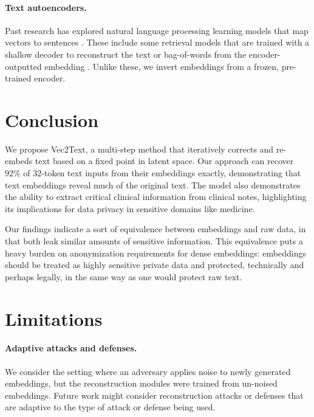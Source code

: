 \documentclass[11pt]{article}
\newcommand{\MethodName}{Vec2Text}
\begin{document}
\paragraph{Text autoencoders.} Past research has explored natural language processing learning models that map vectors to sentences \cite{bowman2016generating}. These include some retrieval models that are trained with a shallow decoder to reconstruct the text or bag-of-words from the encoder-outputted embedding \cite{xiao2022retromae,shen2023lexmae,wang2023simlm}. Unlike these, we invert embeddings from a frozen, pre-trained encoder.

\section{Conclusion}

We propose \MethodName, a multi-step method that iteratively corrects and re-embeds text based on a fixed point in latent space. Our approach can recover $92\%$  of $32$-token text inputs from their embeddings exactly, demonstrating that text embeddings reveal much of the original text. The model also demonstrates the ability to extract critical clinical information from clinical notes, highlighting its implications for data privacy in sensitive domains like medicine.

Our findings indicate a sort of equivalence between embeddings and raw data, in that both leak similar amounts of sensitive information. This equivalence puts a heavy burden on anonymization requirements for dense embeddings: embeddings should be treated as highly sensitive private data and protected, technically and perhaps legally, in the same way as one would protect raw text.


\section{Limitations}


\paragraph{Adaptive attacks and defenses.} We consider the setting where an adversary applies noise to newly generated embeddings, but the reconstruction modules were trained from un-noised embeddings. Future work might consider reconstruction attacks or defenses that are adaptive to the type of attack or defense being used.
\end{document}
